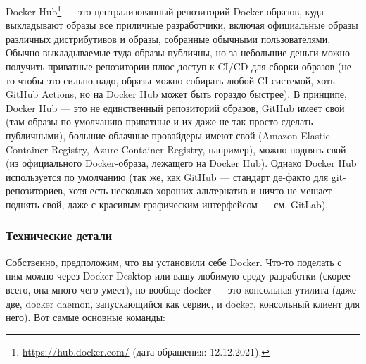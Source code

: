 \documentclass[a5paper]{article}
\begin{document}
Docker Hub\footnote{\url{https://hub.docker.com/} (дата обращения: 12.12.2021).} --- это централизованный репозиторий Docker-образов, куда выкладывают образы все приличные разработчики, включая официальные образы различных дистрибутивов и образы, собранные обычными пользователями. Обычно выкладываемые туда образы публичны, но за небольшие деньги можно получить приватные репозитории плюс доступ к CI/CD для сборки образов (не то чтобы это сильно надо, образы можно собирать любой CI-системой, хоть GitHub Actions, но на Docker Hub может быть гораздо быстрее). В принципе, Docker Hub --- это не единственный репозиторий образов, GitHub имеет свой (там образы по умолчанию приватные и их даже не так просто сделать публичными), большие облачные провайдеры имеют свой (Amazon Elastic Container Registry, Azure Container Registry, например), можно поднять свой (из официального Docker-образа, лежащего на Docker Hub). Однако Docker Hub используется по умолчанию (так же, как GitHub --- стандарт де-факто для git-репозиториев, хотя есть несколько хороших альтернатив и ничто не мешает поднять свой, даже с красивым графическим интерфейсом --- см. GitLab).

\subsubsection{Технические детали}

Собственно, предположим, что вы установили себе Docker. Что-то поделать с ним можно через Docker Desktop или вашу любимую среду разработки (скорее всего, она много чего умеет), но вообще docker --- это консольная утилита (даже две, docker daemon, запускающийся как сервис, и docker, консольный клиент для него). Вот самые основные команды:
\end{document}
